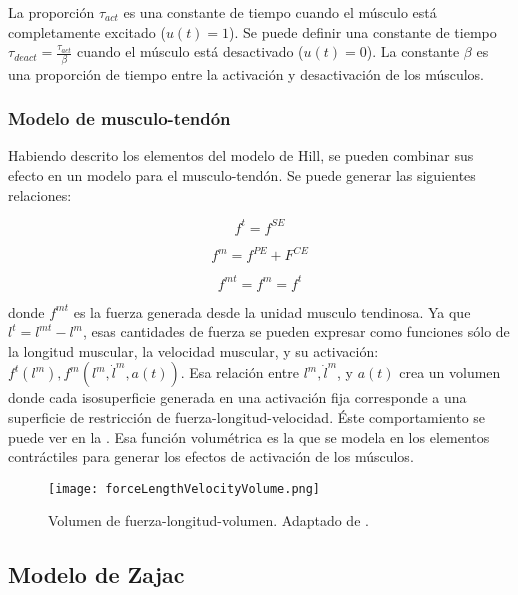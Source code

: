 La proporción $\tau_{act}$ es una constante de tiempo cuando el músculo está completamente excitado ($u(t) = 1$). Se puede definir una constante de tiempo $\tau_{deact} = \frac{\tau_{act}}{\beta}$ cuando el músculo está desactivado ($u(t) = 0$). La constante $\beta$ es una proporción de tiempo entre la activación y desactivación de los músculos. 

\subsubsection{Modelo de musculo-tendón}

Habiendo descrito los elementos del modelo de Hill, se pueden combinar sus efecto en un modelo para el musculo-tendón. Se puede generar las siguientes relaciones:

\begin{equation}
	f^t = f^{SE}
\end{equation} 

\begin{equation}
	f^m = f^{PE} + F^{CE}
\end{equation} 

\begin{equation}
	f^{mt} = f^m = f^t
\end{equation} 

donde $f^{mt}$ es la fuerza generada desde la unidad musculo tendinosa. Ya que $l^t=l^{mt} - l^m$, esas cantidades de fuerza se pueden expresar como funciones sólo de la longitud muscular, la velocidad muscular, y su activación: $f^t(l^m), f^m(l^m, \dot{l}^m, a(t))$. Esa relación entre $l^m, \dot{l}^m$, y $a(t)$ crea un volumen donde cada isosuperficie generada en una activación fija corresponde a una superficie de restricción de fuerza-longitud-velocidad. Éste comportamiento se puede ver en la . Esa función volumétrica es la que se modela en los elementos contráctiles para generar los efectos de activación de los músculos.

\begin{figure}[!ht]
	\centering
		\texttt{[image: forceLengthVelocityVolume.png]}
	\caption[Volumen de fuerza-longitud-volumen.]{Volumen de fuerza-longitud-volumen. Adaptado de \citep{ng2001anatomically}.}
	\label{fig:forceLengthVelocityVolume}
\end{figure}

\subsection{Modelo de Zajac}

